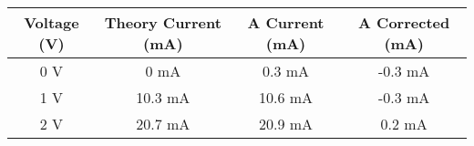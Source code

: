 \begin{tabular}{ | c | c | c | c | } \hline
	Voltage (V) & Theory Current (mA) & A Current (mA) & A Corrected (mA) \\ \hline
	0 V & 0 mA & 0.3 mA & -0.3 mA \\ \hline
	1 V & 10.3 mA & 10.6 mA & -0.3 mA \\ \hline
	2 V & 20.7 mA & 20.9 mA & 0.2 mA \\ \hline
\end{tabular}